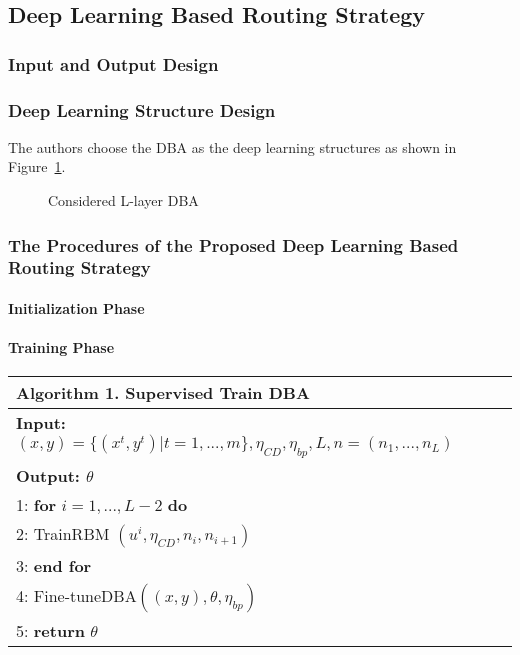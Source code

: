 \documentclass[11pt]{report}
\begin{document}
	\subsection{Deep Learning Based Routing Strategy}
	\subsubsection{Input and Output Design}
	
	\subsubsection{Deep Learning Structure Design}
	The authors choose the DBA as the deep learning structures as shown in Figure~\ref{1stfig}.
	\begin{figure}[h!]
		\centering
		\caption{Considered L-layer DBA}
		\label{1stfig}
	\end{figure}
	
	\subsubsection{The Procedures of the Proposed Deep Learning Based Routing Strategy}
	\paragraph{Initialization Phase}

	\paragraph{Training Phase}
     
	\begin{tabular}{lc}
		\toprule
		\textbf{Algorithm 1}. Supervised Train DBA\\
		\hline
		\textbf{Input:} $\left(x,y\right)=\{\left(x^t,y^t\right)|t=1,...,m\}, \eta_{CD}, \eta_{bp},L, n=\left(n_1,...,n_L\right)$\\
		\textbf{Output: $\theta$}\\
		1: \textbf{for} $i=1,...,L-2$ \textbf{do}\\
		2: \quad TrainRBM $\left(u^i,\eta_{CD},n_i,n_{i+1}\right)$\\
		3: \textbf{end for}\\
		4: Fine-tuneDBA$\left(\left(x,y\right),\theta,\eta_{bp}\right)$\\
		5: \textbf{return} $\theta$\\
		\hline
	\end{tabular}
\end{document}
